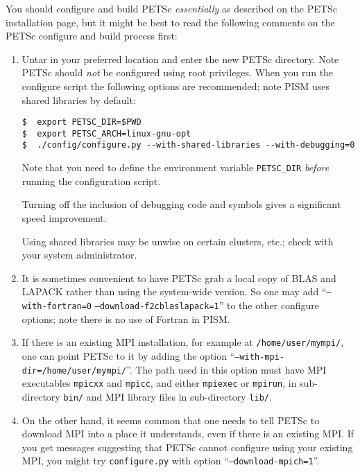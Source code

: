 \documentclass[titlepage,letterpaper,final]{scrartcl}
\begin{document}
You should configure and build PETSc \emph{essentially} as described on the
PETSc installation page, but it might be best to read the following comments on
the PETSc configure and build process first:

\renewcommand{\labelenumi}{(\roman{enumi})}
\begin{enumerate}
\item Untar in your preferred location and enter the new PETSc directory.
  Note PETSc should \emph{not} be configured using root privileges.
  When you run the configure script the following
  options are recommended; note PISM uses shared libraries by
  default:
\begin{verbatim}
$  export PETSC_DIR=$PWD
$  export PETSC_ARCH=linux-gnu-opt
$  ./config/configure.py --with-shared-libraries --with-debugging=0
\end{verbatim}

Note that you need to define the environment variable
\texttt{PETSC_DIR} \emph{before} running the configuration
script.

Turning off the inclusion of debugging code and symbols gives a significant speed improvement.

Using shared libraries may be unwise on certain clusters, etc.; check with your system administrator.

\item It is sometimes convenient to have PETSc grab a local copy of BLAS and LAPACK rather than using the system-wide version.  So one may add ``\texttt{--with-fortran=0} \texttt{--download-f2cblaslapack=1}'' to the other configure options; note there is no use of Fortran in PISM.

\item If there is an existing MPI installation, for example at \texttt{/home/user/mympi/}, one can point PETSc to it by adding the option ``\texttt{--with-mpi-dir=/home/user/mympi/}''.  The path used in this option must have MPI executables \texttt{mpicxx} and \texttt{mpicc}, and either \texttt{mpiexec} or \texttt{mpirun}, in sub-directory \texttt{bin/} and MPI library files in sub-directory \texttt{lib/}.

\item On the other hand, it seems common that one needs to tell PETSc to download MPI into a place it understands, even if there is an existing MPI.  If you get messages suggesting that PETSc cannot configure using your existing MPI, you might try \texttt{configure.py} with option ``\texttt{--download-mpich=1}''.


\end{enumerate}
\end{document}
